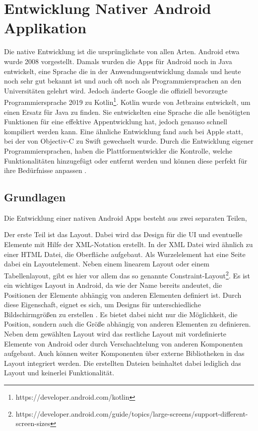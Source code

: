 \section{Entwicklung Nativer Android Applikation}
Die native Entwicklung ist die ursprünglichste von allen Arten. Android etwa wurde 2008 vorgestellt. 
Damals wurden die Apps für Android noch in Java entwickelt, eine Sprache die in der Anwendungsentwicklung damals und heute noch sehr gut bekannt ist und auch oft noch als Programmiersprachen an den Universitäten gelehrt wird. 
Jedoch änderte Google die offiziell bevorzugte Programmiersprache 2019 zu Kotlin\footnote{https://developer.android.com/kotlin}. 
Kotlin wurde von Jetbrains entwickelt, um einen Ersatz für Java zu finden. 
Sie entwickelten eine Sprache die alle benötigten Funktionen für eine effektive Appentwicklung hat, jedoch genauso schnell kompiliert werden kann. 
Eine ähnliche Entwicklung fand auch bei Apple statt, bei der von Objectiv-C zu Swift gewechselt wurde. 
Durch die Entwicklung eigener Programmiersprachen, haben die Plattformentwickler die Kontrolle, welche Funktionalitäten hinzugefügt oder entfernt werden und können diese perfekt für ihre Bedürfnisse anpassen \cite{medium_Swift_Kotlin}.

\subsection{Grundlagen}
Die Entwicklung einer nativen Android \acp{App} besteht aus zwei separaten Teilen, 

Der erste Teil ist das Layout. Dabei wird das Design für die UI und eventuelle Elemente mit Hilfe der XML-Notation erstellt.
In der XML Datei wird ähnlich zu einer HTML Datei, die Oberfläche aufgebaut. Als Wurzelelement hat eine Seite dabei ein Layoutelement. Neben einem linearem Layout oder einem Tabellenlayout, gibt es hier vor allem das so genannte Constraint-Layout\footnote{https://developer.android.com/guide/topics/large-screens/support-different-screen-sizes}. 
Es ist ein wichtiges Layout in Android, da wie der Name bereits andeutet, die Positionen der Elemente abhängig von anderen Elementen definiert ist. Durch diese Eigenschaft, eignet es sich, um Designs für unterschiedliche Bildschirmgrößen zu erstellen \cite{ConstraintLayout_Android}. Es bietet dabei nicht nur die Möglichkeit, die Position, sondern auch die Größe abhängig von anderen Elementen zu definieren. Neben dem gewählten Layout wird das restliche Layout mit vordefinierte Elemente von Android oder durch Verschachtelung von anderen Komponenten aufgebaut. Auch können weiter Komponenten über externe Bibliotheken in das Layout integriert werden. Die erstellten Dateien beinhaltet dabei lediglich das Layout und keinerlei Funktionalität.

